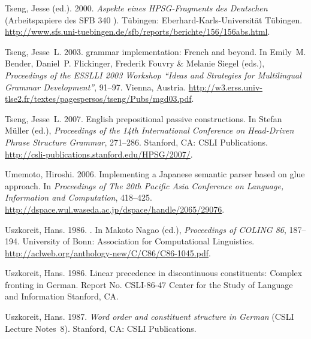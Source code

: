 \begin{thebibliography}{1420}
Tseng, Jesse (ed.). 2000.
\newblock \emph{{Aspekte eines HPSG-Fragments des Deutschen}} (Arbeitspapiere
  des SFB 340 ).
\newblock T{\"u}bingen: Eberhard-Karls-Uni\-ver\-si\-t{\"a}t T{\"u}bingen.
\newblock
  \urlprefix\url{http://www.sfs.uni-tuebingen.de/sfb/reports/berichte/156/156abs.html}.

Tseng, Jesse~L. 2003.
 grammar implementation: {French} and beyond.
\newblock In Emily~M. Bender, Daniel~P. Flickinger, Frederik Fouvry \& Melanie
  Siegel (eds.), \emph{Proceedings of the {ESSLLI 2003 Workshop ``Ideas and
  Strategies for Multilingual Grammar Development''}}, 91--97. Vienna, Austria.
\newblock
  \urlprefix\url{http://w3.erss.univ-tlse2.fr/textes/pagespersos/tseng/Pubs/mgd03.pdf}.

Tseng, Jesse~L. 2007.
\newblock English prepositional passive constructions.
\newblock In Stefan M{\"u}ller (ed.), \emph{Proceedings of the {14th
  International Conference on Head-Driven Phrase Structure Grammar}}, 271--286.
  Stanford, CA: CSLI Publications.
\newblock \urlprefix\url{http://csli-publications.stanford.edu/HPSG/2007/}.

Umemoto, Hiroshi. 2006.
\newblock Implementing a {Japanese} semantic parser based on glue approach.
\newblock In \emph{Proceedings of {The 20th Pacific Asia Conference on
  Language, Information and Computation}}, 418--425.
\newblock
  \urlprefix\url{http://dspace.wul.waseda.ac.jp/dspace/handle/2065/29076}.

Uszkoreit, Hans. 1986{}.
.
\newblock In Makoto Nagao (ed.), \emph{Proceedings of {COLING} 86}, 187--194.
  University of Bonn: Association for Computational Linguistics.
\newblock \urlprefix\url{http://aclweb.org/anthology-new/C/C86/C86-1045.pdf}.

Uszkoreit, Hans. 1986{}.
\newblock Linear precedence in discontinuous constituents: Complex fronting in
  {German}.
\newblock Report {No. CSLI-86-47} Center for the Study of Language and
  Information Stanford, CA.

Uszkoreit, Hans. 1987.
\newblock \emph{Word order and constituent structure in {German}} (CSLI Lecture
  Notes~8).
\newblock Stanford, CA: CSLI Publications.


\end{thebibliography}
